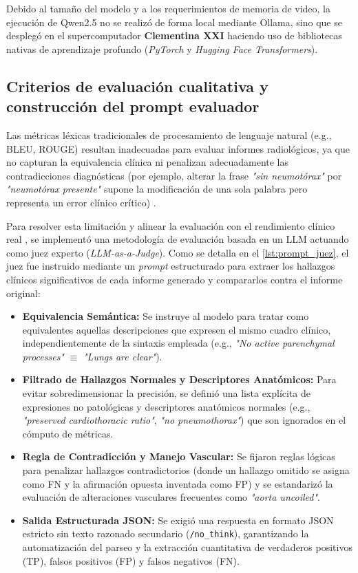 \documentclass[../tesis.tex]{subfiles}
\begin{document}
Debido al tamaño del modelo y a los requerimientos de memoria de video, la ejecución de Qwen2.5 no se realizó de forma local mediante Ollama, sino que se desplegó en el supercomputador \textbf{Clementina XXI} haciendo uso de bibliotecas nativas de aprendizaje profundo (\textit{PyTorch} y \textit{Hugging Face Transformers}).

\subsection{Criterios de evaluación cualitativa y construcción del prompt evaluador}
\label{subsec:prompt_juez}

Las métricas léxicas tradicionales de procesamiento de lenguaje natural (e.g., BLEU, ROUGE) resultan inadecuadas para evaluar informes radiológicos, ya que no capturan la equivalencia clínica ni penalizan adecuadamente las contradicciones diagnósticas (por ejemplo, alterar la frase \textit{"sin neumotórax"} por \textit{"neumotórax presente"} supone la modificación de una sola palabra pero representa un error clínico crítico) \citep{Artsi_et_al._2025}.

Para resolver esta limitación y alinear la evaluación con el rendimiento clínico real \citep{Doshi_et_al._2024}, se implementó una metodología de evaluación basada en un LLM actuando como juez experto (\textit{LLM-as-a-Judge}). Como se detalla en el \autoref{lst:prompt_juez}, el juez fue instruido mediante un \textit{prompt} estructurado para extraer los hallazgos clínicos significativos de cada informe generado y compararlos contra el informe original:

\begin{itemize}
    \item \textbf{Equivalencia Semántica:} Se instruye al modelo para tratar como equivalentes aquellas descripciones que expresen el mismo cuadro clínico, independientemente de la sintaxis empleada (e.g., \textit{"No active parenchymal processes"} $\equiv$ \textit{"Lungs are clear"}).
    \item \textbf{Filtrado de Hallazgos Normales y Descriptores Anatómicos:} Para evitar sobredimensionar la precisión, se definió una lista explícita de expresiones no patológicas y descriptores anatómicos normales (e.g., \textit{"preserved cardiothoracic ratio"}, \textit{"no pneumothorax"}) que son ignorados en el cómputo de métricas.
    \item \textbf{Regla de Contradicción y Manejo Vascular:} Se fijaron reglas lógicas para penalizar hallazgos contradictorios (donde un hallazgo omitido se asigna como FN y la afirmación opuesta inventada como FP) y se estandarizó la evaluación de alteraciones vasculares frecuentes como \textit{"aorta uncoiled"}.
    \item \textbf{Salida Estructurada JSON:} Se exigió una respuesta en formato JSON estricto sin texto razonado secundario (\texttt{/no\_think}), garantizando la automatización del parseo y la extracción cuantitativa de verdaderos positivos (TP), falsos positivos (FP) y falsos negativos (FN).
\end{itemize}
\end{document}
